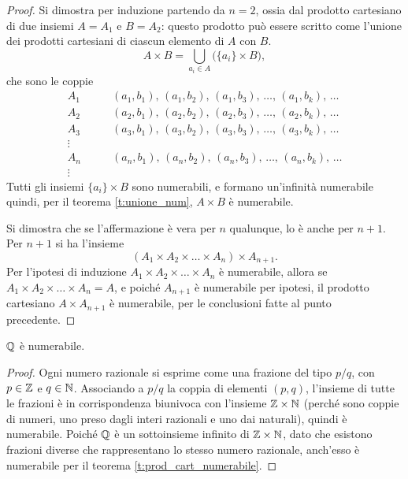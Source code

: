 \begin{proof}
Si dimostra per induzione partendo da $n=2$, ossia dal prodotto cartesiano di due insiemi $A=A_1$ e $B=A_2$: questo prodotto può essere scritto come l'unione dei prodotti cartesiani di ciascun elemento di $A$ con $B$.
\[
A\times B=\bigcup_{a_i\in A}\big(\{a_i\}\times B\big),
\]
che sono le coppie
\begin{align*}
A_1\qquad &(a_1,b_1),\,(a_1,b_2),\,(a_1,b_3),\,\dots,\,(a_1,b_k),\,\dots\\
A_2\qquad &(a_2,b_1),\,(a_2,b_2),\,(a_2,b_3),\,\dots,\,(a_2,b_k),\,\dots\\
A_3\qquad &(a_3,b_1),\,(a_3,b_2),\,(a_3,b_3),\,\dots,\,(a_3,b_k),\,\dots\\
\vdots\\
A_n\qquad &(a_n,b_1),\,(a_n,b_2),\,(a_n,b_3),\,\dots,\,(a_n,b_k),\,\dots\\
\vdots
\end{align*}
Tutti gli insiemi $\{a_i\}\times B$ sono numerabili, e formano un'infinità numerabile quindi, per il teorema \ref{t:unione_num}, $A\times B$ è numerabile.

Si dimostra che se l'affermazione è vera per $n$ qualunque, lo è anche per $n+1$. Per $n+1$ si ha l'insieme
\[
(A_1\times A_2\times\dots\times A_n)\times A_{n+1}.
\]
Per l'ipotesi di induzione $A_1\times A_2\times\dots\times A_n$ è numerabile, allora se $A_1\times A_2\times\dots\times A_n=A$, e poiché $A_{n+1}$ è numerabile per ipotesi, il prodotto cartesiano $A\times A_{n+1}$ è numerabile, per le conclusioni fatte al punto precedente.
\end{proof}
\begin{corollario}
$\mathbb{Q}$ è numerabile.
\end{corollario}
\begin{proof}
Ogni numero razionale si esprime come una frazione del tipo $p/q$, con $p\in\mathbb{Z}$ e $q\in\mathbb{N}$. Associando a $p/q$ la coppia di elementi $(p,q)$, l'insieme di tutte le frazioni è in corrispondenza biunivoca con l'insieme $\mathbb{Z}\times\mathbb{N}$ (perché sono coppie di numeri, uno preso dagli interi razionali e uno dai naturali), quindi è numerabile. Poiché $\mathbb{Q}$ è un sottoinsieme infinito di $\mathbb{Z}\times\mathbb{N}$, dato che esistono frazioni diverse che rappresentano lo stesso numero razionale, anch'esso è numerabile per il teorema \ref{t:prod_cart_numerabile}.
\end{proof}

